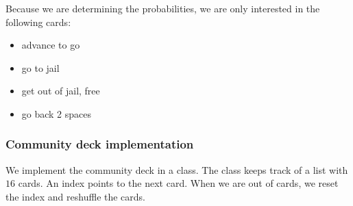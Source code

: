 \documentclass[11pt]{article}
\providecommand{\tightlist}{%
      \setlength{\itemsep}{0pt}\setlength{\parskip}{0pt}}
\begin{document}
    Because we are determining the probabilities, we are only
interested in the following cards:

\begin{itemize}
\tightlist
\item
  advance to go
\item
  go to jail
\item
  get out of jail, free
\item
  go back 2 spaces
\end{itemize}

    \hypertarget{community-deck-implementation}{%
\subsubsection{Community deck
implementation}\label{community-deck-implementation}}

    We implement the community deck in a class. The class keeps track of a
list with \(16\) cards. An index points to the next card. When we are
out of cards, we reset the index and reshuffle the cards.
\end{document}
